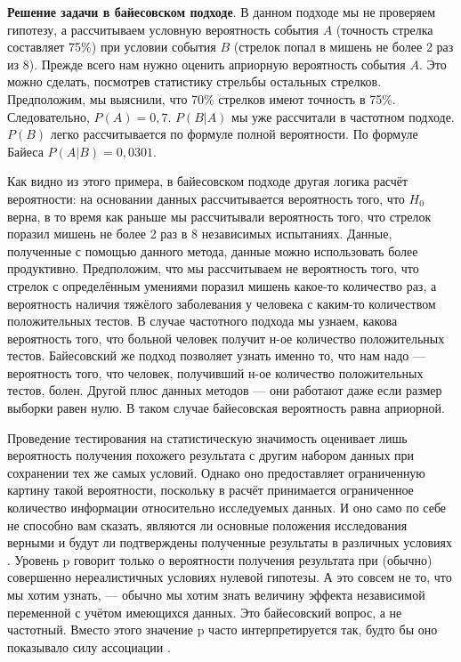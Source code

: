 \textbf{Решение задачи в байесовском подходе}. В данном подходе мы не проверяем гипотезу, а рассчитываем условную вероятность события $A$ (точность стрелка составляет 75\%) при условии события $B$ (стрелок попал в мишень не более 2 раз из 8). Прежде всего нам нужно оценить априорную вероятность события $A$. Это можно сделать, посмотрев статистику стрельбы остальных стрелков. Предположим, мы выяснили, что 70\% стрелков имеют точность в 75\%. Следовательно, $P(A)=0,7$. $P(B|A)$ мы уже рассчитали в частотном подходе. $P(B)$ легко рассчитывается по формуле полной вероятности. По формуле Байеса $P(A|B)=0,0301$. 

Как видно из этого примера, в байесовском подходе другая логика расчёт вероятности: на основании данных рассчитывается вероятность того, что $H_{0}$ верна, в то время как раньше мы рассчитывали вероятность того, что стрелок поразил мишень не более 2 раз в 8 независимых испытаниях. Данные, полученные с помощью данного метода, данные можно использовать более продуктивно. Предположим, что мы рассчитываем не вероятность того, что стрелок с определённым умениями поразил мишень какое-то количество раз, а вероятность наличия тяжёлого заболевания у человека с каким-то количеством положительных тестов. В случае частотного подхода мы узнаем, какова вероятность того, что больной человек получит н-ое количество положительных тестов. Байесовский же подход позволяет узнать именно то, что нам надо --- вероятность того, что человек, получивший н-ое количество положительных тестов, болен. Другой плюс данных методов --- они работают даже если размер выборки равен нулю. В таком случае байесовская вероятность равна априорной.

Проведение тестирования на статистическую значимость оценивает лишь вероятность получения похожего результата с другим набором данных при сохранении тех же самых условий. Однако оно предоставляет ограниченную картину такой вероятности, поскольку в расчёт принимается ограниченное количество информации относительно исследуемых данных. И оно само по себе не способно вам сказать, являются ли основные положения исследования верными и будут ли подтверждены полученные результаты в различных условиях \cite{bastian2013}. Уровень p говорит только о вероятности получения результата при (обычно) совершенно нереалистичных условиях нулевой гипотезы. А это совсем не то, что мы хотим узнать, --- обычно мы хотим знать величину эффекта независимой переменной с учётом имеющихся данных. Это байесовский вопрос, а не частотный. Вместо этого значение p часто интерпретируется так, будто бы оно показывало силу ассоциации \cite[стр. 11]{Schrodt2010}.

